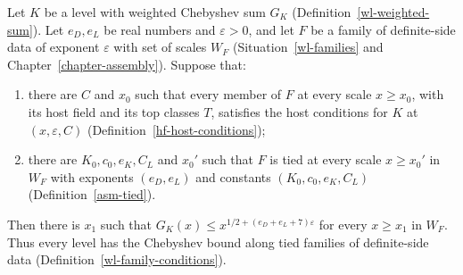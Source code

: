 \begin{theorem}\label{ib-window-bound-on-scales}
Let $K$ be a level with weighted Chebyshev sum $G_K$
(Definition~\ref{wl-weighted-sum}). Let $e_D,e_L$ be real numbers and
$\varepsilon>0$, and let $F$ be a family of definite-side data of exponent
$\varepsilon$ with set of scales $W_F$ (Situation~\ref{wl-families} and
Chapter~\ref{chapter-assembly}). Suppose that:
\begin{enumerate}
\item there are $C$ and $x_0$ such that every member of $F$ at every scale
  $x\geq x_0$, with its host field and its top classes $T$,
  satisfies the host conditions for $K$ at $(x,\varepsilon,C)$
  (Definition~\ref{hf-host-conditions});
\item there are $K_0,c_0,e_K,C_L$ and $x_0'$ such that $F$ is tied at every
  scale $x\geq x_0'$ in $W_F$ with exponents $(e_D,e_L)$ and constants
  $(K_0,c_0,e_K,C_L)$ (Definition~\ref{asm-tied}).
\end{enumerate}
Then there is $x_1$ such that $G_K(x)\leq x^{1/2+(e_D+e_L+7)\varepsilon}$ for
every $x\geq x_1$ in $W_F$. Thus every level has the Chebyshev bound along tied
families of definite-side data (Definition~\ref{wl-family-conditions}).
\end{theorem}
